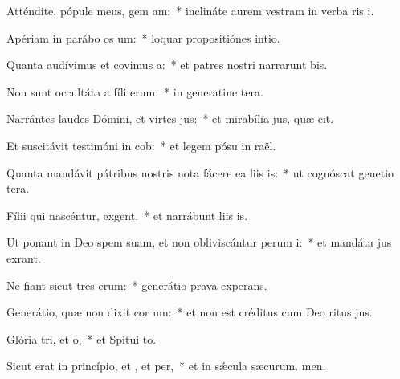 \item Atténdite, pópule meus, gem am:~* inclináte aurem vestram in verba ris i.
\item Apériam in parábo os um:~* loquar propositiónes  intio.
\item Quanta audívimus et covimus a:~* et patres nostri narrarunt bis.
\item Non sunt occultáta a fíli erum:~* in generatine tera.
\item Narrántes laudes Dómini, et virtes jus:~* et mirabília jus, quæ cit.
\item Et suscitávit testimóni in cob:~* et legem pósu in raël.
\item Quanta mandávit pátribus nostris nota fácere ea liis is:~* ut cognóscat genetio tera.
\item Fílii qui nascéntur,  exgent,~* et narrábunt liis is.
\item Ut ponant in Deo spem suam, et non obliviscántur perum i:~* et mandáta jus exrant.
\item Ne fiant sicut tres erum:~* generátio prava  experans.
\item Generátio, quæ non dixit cor um:~* et non est créditus cum Deo ritus jus.
\item Glória tri, et o,~* et Spitui to.
\item Sicut erat in princípio, et , et per,~* et in sǽcula sæcurum. men.
